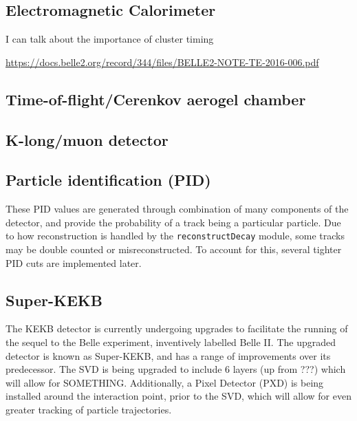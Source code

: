 \documentclass[12pt,a4paper]{article} %
\begin{document}
\subsection{Electromagnetic Calorimeter}

I can talk about the importance of cluster timing

\url{https://docs.belle2.org/record/344/files/BELLE2-NOTE-TE-2016-006.pdf}



\subsection{Time-of-flight/Cerenkov aerogel chamber}



\subsection{K-long/muon detector}




\subsection{Particle identification (PID)}


These PID values are generated through combination of many components of the detector, and provide the probability of a track being a particular particle. Due to how reconstruction is handled by the \texttt{reconstructDecay} module, some tracks may be double counted or misreconstructed. To account for this, several tighter PID cuts are implemented later.





\subsection{Super-KEKB}

The KEKB detector is currently undergoing upgrades to facilitate the running of the sequel to the Belle experiment, inventively labelled Belle II. The upgraded detector is known as Super-KEKB, and has a range of improvements over its predecessor. The SVD is being upgraded to include 6 layers (up from ???) which will allow for SOMETHING. Additionally, a Pixel Detector (PXD) is being installed around the interaction point, prior to the SVD, which will allow for even greater tracking of particle trajectories.
\end{document}
